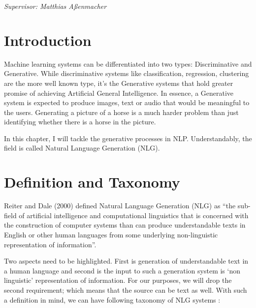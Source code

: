 \documentclass[]{krantz}
\begin{document}
\emph{Supervisor: Matthias Aßenmacher}

\hypertarget{introduction}{%
\section{Introduction}\label{introduction}}

Machine learning systems can be differentiated into two types: Discriminative and Generative. While discriminative systems like classification, regression, clustering are the more well known type, it's the Generative systems that hold greater promise of achieving Artificial General Intelligence. In essence, a Generative system is expected to produce images, text or audio that would be meaningful to the users. Generating a picture of a horse is a much harder problem than just identifying whether there is a horse in the picture.

In this chapter, I will tackle the generative processes in NLP. Understandably, the field is called Natural Language Generation (NLG).

\hypertarget{definition-and-taxonomy}{%
\section{Definition and Taxonomy}\label{definition-and-taxonomy}}

Reiter and Dale (2000) defined Natural Language Generation (NLG) as ``the sub-field of artificial intelligence and computational linguistics that is concerned with the construction of computer systems than can produce understandable texts in English or other human languages from some underlying non-linguistic representation of information''.

Two aspects need to be highlighted. First is generation of understandable text in a human language and second is the input to such a generation system is `non linguistic' representation of information. For our purposes, we will drop the second requirement; which means that the source can be text as well. With such a definition in mind, we can have following taxonomy of NLG systems :
\end{document}
